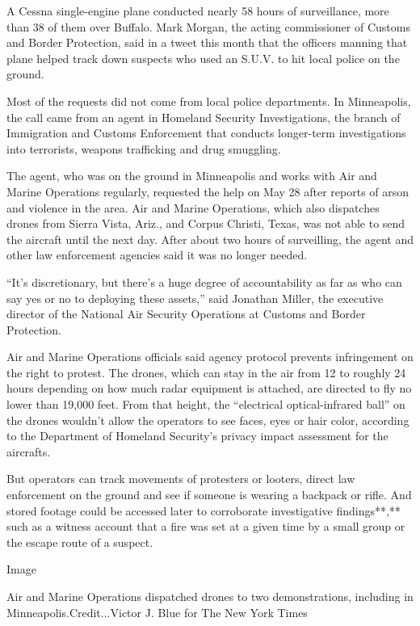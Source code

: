 A Cessna single-engine plane conducted nearly 58 hours of surveillance,
more than 38 of them over Buffalo. Mark Morgan, the acting commissioner
of Customs and Border Protection, said in a tweet this month that the
officers manning that plane helped track down suspects who used an
S.U.V. to hit local police on the ground.

Most of the requests did not come from local police departments. In
Minneapolis, the call came from an agent in Homeland Security
Investigations, the branch of Immigration and Customs Enforcement that
conducts longer-term investigations into terrorists, weapons trafficking
and drug smuggling.

The agent, who was on the ground in Minneapolis and works with Air and
Marine Operations regularly, requested the help on May 28 after reports
of arson and violence in the area. Air and Marine Operations, which also
dispatches drones from Sierra Vista, Ariz., and Corpus Christi, Texas,
was not able to send the aircraft until the next day. After about two
hours of surveilling, the agent and other law enforcement agencies said
it was no longer needed.

``It's discretionary, but there's a huge degree of accountability as far
as who can say yes or no to deploying these assets,'' said Jonathan
Miller, the executive director of the National Air Security Operations
at Customs and Border Protection.

Air and Marine Operations officials said agency protocol prevents
infringement on the right to protest. The drones, which can stay in the
air from 12 to roughly 24 hours depending on how much radar equipment is
attached, are directed to fly no lower than 19,000 feet. From that
height, the ``electrical optical-infrared ball'' on the drones wouldn't
allow the operators to see faces, eyes or hair color, according to the
Department of Homeland Security's privacy impact assessment for the
aircrafts.

But operators can track movements of protesters or looters, direct law
enforcement on the ground and see if someone is wearing a backpack or
rifle. And stored footage could be accessed later to corroborate
investigative findings**,** such as a witness account that a fire was
set at a given time by a small group or the escape route of a suspect.

Image

Air and Marine Operations dispatched drones to two demonstrations,
including in Minneapolis.Credit...Victor J. Blue for The New York Times

